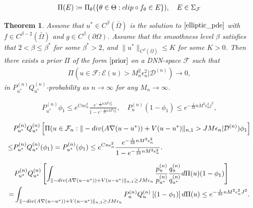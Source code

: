 \documentclass[10pt,a4paper]{amsart}
\newtheorem{theorem}{Theorem}
\newcommand{\D}{\mathcal{D}}
\newcommand{\F}{\mathcal{F}}
\newcommand{\clip}{\textnormal{clip}}
\renewcommand{\div}{\textnormal{div}}
\begin{document}
\begin{align} \label{prior}
    \Pi(E) \coloneqq \Pi_\theta(\{\theta \in \Theta: \clip \circ f_\theta \in E \}), \quad E \in \Sigma_{\F}
\end{align}

\begin{theorem}\label{upper_bound}
     Assume that $u^*  \in C^\beta(\bar{\Omega})$ is the solution to $\eqref{elliptic_pde}$ with $f \in C^{\beta-2}(\bar{\Omega})$ and $g \in C^\beta(\partial{\Omega})$.  Assume that the smoothness level $\beta$ satisfies that  $2 < \beta \leq \beta^\ast$ for some $\beta^\ast > 2$, and $\|u^*\|_{C^{\beta}(\bar{\Omega})} \leq K$ for some $K > 0$. Then there exists 
     a prior $\Pi$ of the form $\eqref{prior}$ on a DNN-space $\F$ such that
     \begin{align} \label{posteior_contraction}
         \Pi(u \in \F: \mathcal{E}(u) > M_n^2 \epsilon_n^2 | \D^{(n)}) \to 0,
     \end{align}
     in $P_{u^*}^{(n)} Q_{u^*}^{(n)}$-probability as $n \to \infty$ for any $M_n \to \infty$. 
\end{theorem}

    \begin{align} \label{phi1}
        P_{u^*}^{(n)} \phi_1 \leq e^{C n \epsilon_n^2} \frac{e^{-\frac{1}{32}n M^2 \epsilon_n^2}}{1 - e^{-\frac{1}{32}n M^2 \epsilon_n^2}}, \quad P_u^{(n)} (1-\phi_1) \leq e^{-\frac{1}{32}n M^2 \epsilon_n^2 j^2},
    \end{align}

    \begin{equation} \label{conditioned_on_phi1}
    \begin{aligned}
        & P_{u^*}^{(n)} Q_{u^*}^{(n)} \left[\Pi(u \in \F_n: \|-\div (A \nabla (u - u^*)) + V(u - u^*) \|_{n, 1} >  J M \epsilon_n | \D^{(n)} ) \phi_1 \right] \\
        \leq & P_{u^*}^{(n)} Q_{u^*}^{(n)} ( \phi_1) = P_{u^*}^{(n)} (\phi_1) \leq e^{C n \epsilon_n^2} \frac{e^{-\frac{1}{32}n M^2 \epsilon_n^2}}{1 - e^{-\frac{1}{32}n M^2 \epsilon_n^2}}.
    \end{aligned}
    \end{equation}

    \begin{equation} \label{upper_bound_numerator}
        \begin{aligned}
            & P_{u^*}^{(n)} Q_{u^*}^{(n)} \left[ \int_{\|-\div (A \nabla (u - u^*)) + V(u - u^*) \|_{n, 1} \geq J M \epsilon_{n}} \frac{p_{u}^{(n)}}{p_{u^*}^{(n)}} \frac{q_{u}^{(n)}}{q_{u^*}^{(n)}} d \Pi(u)  (1 - \phi_{1}) \right] \\
     = & \int_{\|-\div (A \nabla (u - u^*)) + V(u - u^*) \|_{n, 1} \geq J M \epsilon_{n}}    P_{u}^{(n)} Q_{u}^{(n)} \left[(1 - \phi_{1}) \right] d \Pi(u) \leq  e^{-\frac{1}{36} n M^2 \epsilon_{n}^2 J^2}. 
        \end{aligned}
    \end{equation}
\end{document}
